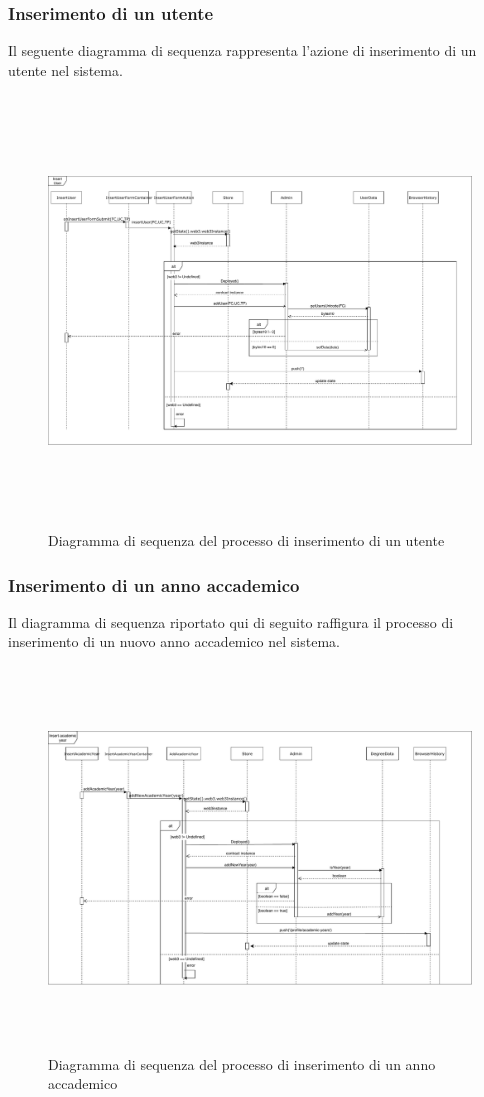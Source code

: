 		\subsubsection{Inserimento di un utente}
		Il seguente diagramma di sequenza rappresenta l'azione di inserimento di un utente nel sistema.
		\begin{figure}[h]
			\centering
				\includegraphics[height=4.5in]{./Diagrammi/DiagrammaSequenzaInsertUser.pdf}
			\caption{Diagramma di sequenza del processo di inserimento di un utente}
			\label{}
		\end{figure}
		
		\subsubsection{Inserimento di un anno accademico}
		Il diagramma di sequenza riportato qui di seguito raffigura il processo di inserimento di un nuovo anno accademico nel sistema.
		
		\begin{figure}[h]
			\centering
				\includegraphics[height=4in]{./Diagrammi/DiagrammaSequenzaInsertAcademicYear.pdf}
			\caption{Diagramma di sequenza del processo di inserimento di un anno accademico}
			\label{}
		\end{figure}
		

